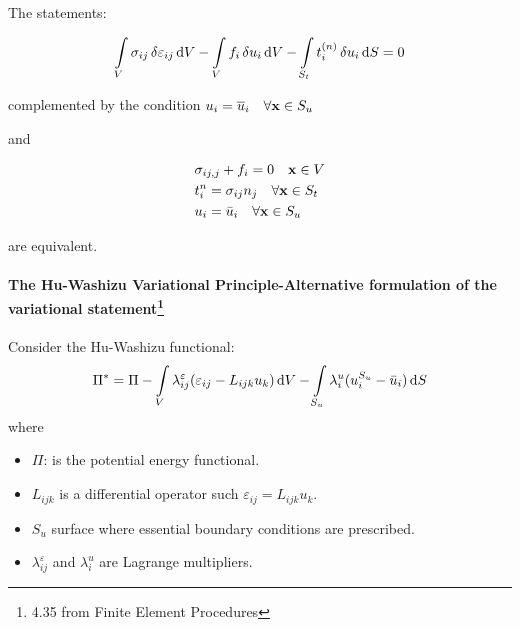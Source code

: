 \begin{tcolorbox}
The statements:

\[\int\limits_V \sigma _{ij}\var{\varepsilon_{ij}}\dd{V}  - \int\limits_V f_i \var{u_i} \dd{V}  - \int\limits_{S_t} t_i^{(n)} \var{u_i}\dd{S}  = 0\]

complemented by the condition $u_i={\overline u}_i \quad \forall \vb{x} \in S_u$

and

\begin{align*} 
\begin{split}
&\sigma_{ij,j} + f_i = 0 \quad \vb{x} \in V \\
&t_i^n = \sigma_{ij} n_j \quad \forall \vb{x} \in S_t\\
&{u_i} = \bar{u}_i \quad \forall \vb{x} \in S_u
\end{split}
\end{align*}

are equivalent.

\end{tcolorbox}





\paragraph*{The Hu-Washizu Variational Principle-Alternative formulation of the variational statement\footnote{4.35 from Finite Element Procedures}}

Consider the Hu-Washizu functional:
\begin{equation}
\Pi^* = \Pi  - \int\limits_V \lambda_{ij}^\varepsilon (\varepsilon_{ij} - L_{ijk} u_k)\dd{V}  - \int\limits_{S_u} \lambda_i^u(u_i^{S_u} - \bar{ u}_i)\dd{S}
\label{eq:Hu}
\end{equation}
where
\begin{itemize}
\item $\Pi$: is the potential energy functional.
\item $L_{ijk}$ is a differential operator such $\varepsilon_{ij} = L_{ijk} u_k$.
\item $S_u$ surface where essential boundary conditions are prescribed.
\item $\lambda_{ij}^\varepsilon $ and $\lambda_i^u$ are Lagrange multipliers.
\end{itemize}

